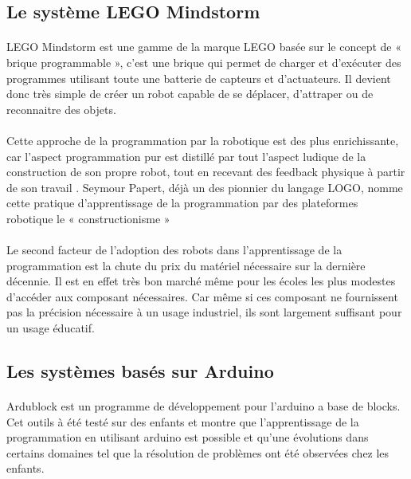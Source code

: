 \documentclass[a4paper]{article}
\begin{document}
\subsection{Le système LEGO Mindstorm}

\paragraph{}
LEGO Mindstorm est une gamme de la marque LEGO basée sur le concept de « brique programmable », c’est une brique qui permet de charger et d’exécuter des programmes utilisant toute une batterie de capteurs et d’actuateurs. Il devient donc très simple de créer un robot capable de se déplacer, d’attraper ou de reconnaitre des objets. \cite{martin1993lego}

\paragraph{}
Cette approche de la programmation par la robotique est des plus enrichissante, car l’aspect programmation pur est distillé par tout l’aspect ludique de la construction de son propre robot, tout en recevant des feedback physique à partir de son travail \cite{weinberg2003robotics}. Seymour Papert, déjà un des pionnier du langage LOGO, nomme cette pratique d’apprentissage de la programmation par des plateformes robotique le « constructionisme » \cite{Papert:1980:MCC:1095592}

\paragraph{}
Le second facteur de l’adoption des robots dans l’apprentissage de la programmation est la chute du prix du matériel nécessaire sur la dernière décennie. Il est en effet très bon marché même pour les écoles les plus modestes d’accéder aux composant nécessaires. Car même si ces composant ne fournissent pas la précision nécessaire à un usage industriel, ils sont largement suffisant pour un usage éducatif.

\subsection{Les systèmes basés sur Arduino}

\paragraph{}
Ardublock est un programme de développement pour l'arduino a base de blocks. Cet outils à été testé sur des enfants et montre que l'apprentissage de la programmation en utilisant arduino est possible et qu'une évolutions dans certains domaines tel que la résolution de problèmes ont été observées chez les enfants.  \cite{sohn2014design}
\end{document}
